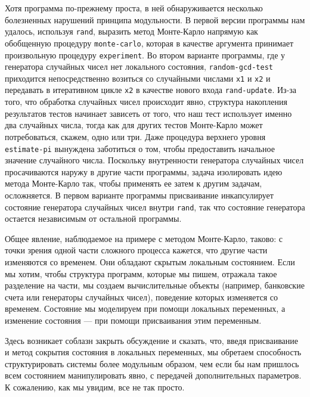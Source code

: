 Хотя программа по-прежнему проста, в ней обнаруживается несколько
болезненных нарушений принципа модульности.  В первой версии программы
нам удалось, используя {\tt rand}, выразить метод Монте-Карло
напрямую как обобщенную процедуру
{\tt monte-carlo}, которая в качестве аргумента принимает
произвольную процедуру {\tt experiment}.  Во втором варианте
программы, где у генератора случайных чисел нет локального состояния,
{\tt random-gcd-test} приходится непосредственно возиться со случайными
числами {\tt x1} и {\tt x2} и передавать в итеративном
цикле {\tt x2} в качестве нового входа
{\tt rand-update}.  Из-за того, что обработка случайных чисел
происходит явно, структура накопления результатов тестов начинает
зависеть от того, что наш тест использует именно два случайных числа,
тогда как для других тестов Монте-Карло может потребоваться, скажем, одно или три.
Даже процедура верхнего уровня {\tt estimate-pi} вынуждена
заботиться о том, чтобы предоставить начальное значение случайного
числа.  Поскольку внутренности генератора случайных чисел просачиваются
наружу в другие части программы, задача изолировать
идею метода Монте-Карло так, чтобы применять ее затем к другим
задачам, осложняется.  В первом варианте программы присваивание инкапсулирует
состояние генератора случайных чисел внутри
{\tt rand}, так что состояние генератора остается независимым
от остальной программы.

Общее явление, наблюдаемое на примере с методом
Монте-Карло, таково: с точки зрения одной части сложного процесса
кажется, что другие части \mbox{изменяются} со временем.  Они обладают
скрытым локальным состоянием.  Если мы хотим, чтобы структура
программ, которые мы пишем, отражала
такое разделение на части, мы создаем вычислительные объекты
(например, банковские счета или генераторы случайных чисел), поведение
которых изменяется со временем.  Состояние мы моделируем при помощи
локальных переменных, а изменение состояния --- при помощи присваивания
этим переменным.

Здесь возникает соблазн закрыть обсуждение и сказать, что, введя
присваивание и метод сокрытия состояния в локальных переменных, мы
обретаем способность структурировать системы более модульным образом,
чем если бы нам пришлось всем состоянием манипулировать явно,
с передачей дополнительных параметров.  К сожалению, как мы увидим, все
не так просто.

